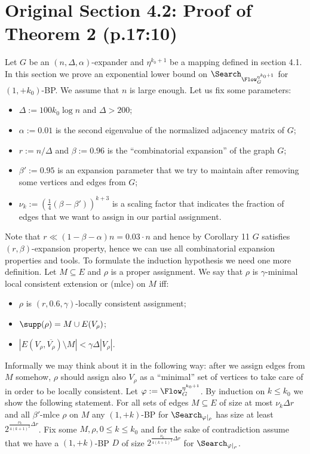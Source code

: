 \section*{Original Section 4.2: Proof of Theorem 2 (p.17:10)}
Let $G$ be an $(n,\Delta,\alpha)$-expander and $\eta^{k_0+1}$ be a mapping defined in section 4.1. In this section we prove an exponential lower bound on $\Search_{\Flow_G^{\eta^{k_0+1}}}$ for $(1,+k_0)$-BP. We assume that $n$ is large enough.
Let us fix some parameters:
\begin{itemize}
\item $\Delta:=100k_0\log n$ and $\Delta>200$;
\item $\alpha:=0.01$ is the second eigenvalue of the normalized adjacency matrix of $G$;
\item $r:=n/\Delta$ and $\beta:=0.96$ is the ``combinatorial expansion'' of the graph $G$;
\item $\beta':=0.95$ is an expansion parameter that we try to maintain after removing some vertices and edges from $G$;
\item $\nu_k:=(\tfrac14(\beta-\beta'))^{k+3}$ is a scaling factor that indicates the fraction of edges that we want to assign in our partial assignment.
\end{itemize}
Note that $r\ll(1-\beta-\alpha)n=0.03\cdot n$ and hence by Corollary 11 $G$ satisfies $(r,\beta)$-expansion property, hence we can use all combinatorial expansion properties and tools.
To formulate the induction hypothesis we need one more definition. Let $M\subseteq E$ and $\rho$ is a proper assignment. We say that $\rho$ is $\gamma$-minimal local consistent extension or (mlce) on $M$ iff:
\begin{itemize}\item $\rho$ is $(r,0.6,\gamma)$-locally consistent assignment;
\item $\supp(\rho)=M\cup E(V_\rho)$;
\item $|E(V_\rho,\overline{V_\rho})\setminus M|<\gamma\Delta|V_\rho|$.\end{itemize}
Informally we may think about it in the following way: after we assign edges from $M$ somehow, $\rho$ should assign also $V_\rho$ as a ``minimal'' set of vertices to take care of in order to be locally consistent.
Let $\varphi:=\Flow_G^{\eta^{k_0+1}}$. By induction on $k\le k_0$ we show the following statement. For all sets of edges $M\subseteq E$ of size at most $\nu_k\Delta r$ and all $\beta'$-mlce $\rho$ on $M$ any $(1,+k)$-BP for $\Search_{\varphi|_\rho}$ has size at least $2^{\frac{\nu_k}{4(k+1)^2}\Delta r}$.
Fix some $M,\rho,0\le k\le k_0$ and for the sake of contradiction assume that we have a $(1,+k)$-BP $D$ of size $2^{\frac{\nu_k}{4(k+1)^2}\Delta r}$ for $\Search_{\varphi|_\rho}$.
